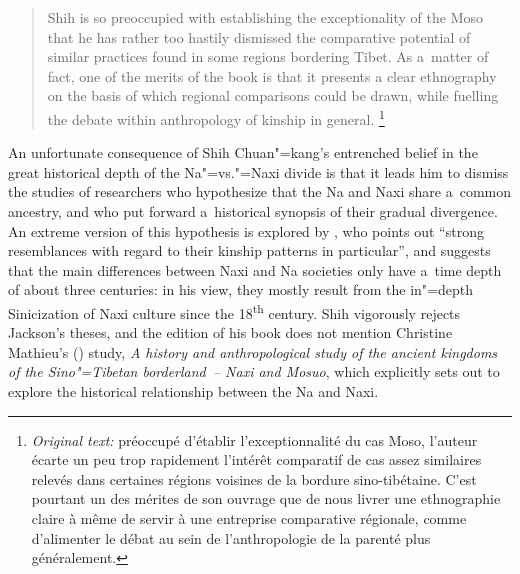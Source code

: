 \begin{quotation}
	Shih is so preoccupied with establishing the exceptionality of the Moso that he
	has rather too hastily dismissed the comparative potential of similar practices found in some
	regions bordering Tibet. As a~matter of fact, one of the merits of the book is that it presents a
	clear ethnography on the basis of which regional comparisons could be drawn, while fuelling
	the debate within anthropology of kinship in general. \citep{gros2011}\footnote{\textit{Original text:} préoccupé d’établir l’exceptionnalité du cas Moso, l’auteur écarte un peu trop rapidement l’intérêt comparatif de cas assez similaires relevés dans certaines régions voisines de la bordure sino-tibétaine. C’est pourtant un des mérites de son ouvrage que de nous livrer une ethnographie claire à même de servir à une entreprise comparative régionale, comme d’alimenter le débat au sein de l’anthropologie de la parenté plus généralement.}
\end{quotation}

\largerpage[-2]
An unfortunate consequence of Shih Chuan"=kang’s entrenched belief in the great historical depth of
the Na"=vs."={Naxi} divide is that it leads him to dismiss the studies of researchers who
hypothesize that the Na and {Naxi} share a~common ancestry, and who put forward a~historical synopsis
of their gradual divergence. An extreme version of this hypothesis is explored by
\citet[33–46]{jackson1979}, who points out “strong resemblances with regard to their kinship
patterns in particular”, and suggests that the main differences between {Naxi} and Na societies only
have a~time depth of about three centuries: in his view, they mostly result from the in"=depth Sinicization
of {Naxi} culture since the 18\textsuperscript{th} century. Shih
vigorously rejects Jackson’s theses, and the \citeyear{shih2010} edition of his book does not mention Christine Mathieu’s (\citeyear{mathieu2003}) study, \textit{A history and anthropological study of the ancient kingdoms of the Sino"=Tibetan borderland~-- {Naxi} and Mosuo},
which explicitly sets out to explore the historical relationship between the Na and {Naxi}.

